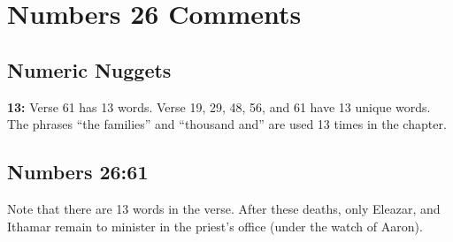 \section{Numbers 26 Comments}

\subsection{Numeric Nuggets}
\textbf{13: } Verse 61 has 13 words. Verse 19, 29, 48, 56, and 61 have 13 unique words. The phrases  ``the families'' and ``thousand and'' are used 13 times in the chapter.

\subsection{Numbers 26:61}
Note that there are 13 words in the verse. After these deaths, only Eleazar, and Ithamar remain to minister in the priest's office (under the watch of Aaron).
